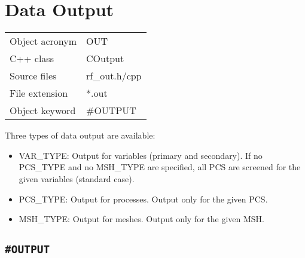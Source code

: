 \section{Data Output}
\label{sec:out}

\begin{tabular*}{8.35cm}{|p{2.5cm}|p{5cm}|} \hline
Object acronym & OUT \\
C++ class      & COutput \\
Source files   & rf\_out.h/cpp \\
\hline
File extension & *.out \\
Object keyword & \#OUTPUT \\
\hline
\end{tabular*}

Three types of data output are
available:
\begin{itemize}
    \item VAR\_TYPE: Output for variables (primary and secondary).
    If no PCS\_TYPE and no MSH\_TYPE are specified, all PCS are
    screened for the given variables (standard case).
    \item PCS\_TYPE: Output for processes. Output only for the
    given PCS.
    \item MSH\_TYPE: Output for meshes. Output only for the given
    MSH.
\end{itemize}

\subsection{\texttt{\bf\#OUTPUT}}


